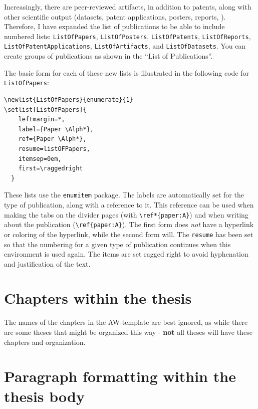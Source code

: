 \documentclass[12pt, twoside]{article}
\begin{document}
Increasingly, there are peer-reviewed artifacts, in addition to patents, along with other scientific output (datasets, patent applications, posters, reports, \etc). Therefore, I have expanded the list of publications to be able to include numbered lists: \texttt{ListOfPapers},  \texttt{ListOfPosters},  \texttt{ListOfPatents},
\texttt{ListOfReports}, \texttt{ListOfPatentApplications},  \texttt{ListOfArtifacts}, and \texttt{ListOfDatasets}. You can create groups of publications as shown in the ``List of Publications''.

The basic form for each of these new lists is illustrated in the following code for \texttt{ListOfPapers}:
\begin{lstlisting}[style=latexExampleForAuthors]
\newlist{ListOfPapers}{enumerate}{1}
\setlist[ListOfPapers]{
    leftmargin=*,
    label={Paper \Alph*},
    ref={Paper \Alph*},
    resume=listOFPapers,
    itemsep=0em,
    first=\raggedright
  }
\end{lstlisting}

These lists use the \texttt{enumitem} package. The labels are automatically set for the type of publication, along with a reference to it. This reference can be used when making the tabs on the divider pages (with \texttt{\textbackslash ref*\{paper:A\}}) and when writing about the publication (\texttt{\textbackslash ref\{paper:A\}}). The first form does \textit{not} have a hyperlink or coloring of the hyperlink, while the second form will. The \texttt{resume} has been set so that the numbering for a given type of publication continues when this environment is used again. The items are set ragged right to avoid hyphenation and justification of the text.

\section{Chapters within the thesis}
\label{sec:cycle3ChaptersWithThesis}

The names of the chapters in the AW-template are best ignored, as while there are some theses that might be organized this way - \textbf{not} all theses will have these chapters and organization.



\section{Paragraph formatting within the thesis body}
\label{sec:cycle3ParagraphFOrmattingQuestionable}
\end{document}
